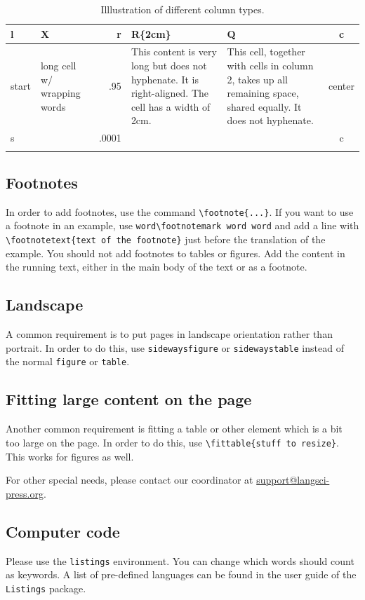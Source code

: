\begin{table}
 \begin{tabularx}{\textwidth}{lXrR{2cm}Qc}
\lsptoprule
l & X & r & R\{2cm\} & Q & c \\
\midrule
  start & long cell w/   wrapping words & .95 & This content is very long but does not hyphenate. It is right-aligned. The cell has a width of 2cm. & This cell, together with cells in column 2, takes up all remaining space, shared equally. It does not hyphenate. & center\\
s & & .0001 & &&  c \\ 
\lspbottomrule
\end{tabularx} 
\caption{Illlustration of different column types.}
\label{tab:colmixes}
\end{table}


\subsection{Footnotes}
In order to add footnotes, use the command \verb+\footnote{...}+. If you want to use a footnote in an example, use \verb+word\footnotemark word word+ and add a line with \verb+\footnotetext{text of the footnote}+ just before the translation of the example. You should not add footnotes to tables or figures. Add the content in the running text, either in the main body of the text or as a footnote. 

\subsection{Landscape}

A common requirement is to put pages in landscape orientation rather than portrait. In order to do this, use \verb+sidewaysfigure+ or \verb+sidewaystable+ instead of the normal \verb+figure+ or \verb+table+.

\subsection{Fitting large content on the page}
Another common requirement is fitting a table or other element which is a bit too large on the page. In order to do this, use \verb+\fittable{stuff to resize}+. This works for figures as well. 

For other special needs, please contact our coordinator at \url{support@langsci-press.org}. 

\subsection{Computer code}
Please use the \verb+listings+ environment. You can change which words should count as keywords. A list of pre-defined languages can be found in the user guide of the \verb+Listings+ package.

